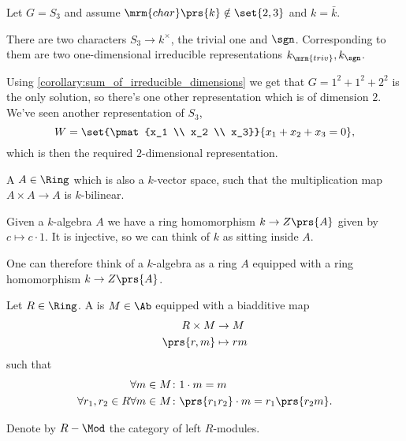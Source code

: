 \documentclass[10pt,a4paper,twoside,openany,hidelinks]{book}
\begin{document}
\begin{example}
Let $G = S_3$ and assume $\mrm{char}\prs{k} \notin \set{2,3}$ and $k = \bar{k}$.

There are two characters $S_3 \to k^\times$, the trivial one and $\sgn$.
Corresponding to them are two one-dimensional irreducible representations $k_{\mrm{triv}}, k_{\sgn}$.

Using \ref{corollary:sum_of_irreducible_dimensions} we get that
$G = 1^2 + 1^2 + 2^2$
is the only solution, so there's one other representation which is of dimension $2$.
We've seen another representation of $S_3$,
\[W = \set{\pmat{x_1 \\ x_2 \\ x_3}}{x_1 + x_2 + x_3 = 0} \text{,}\]
which is then the required $2$-dimensional representation.
\end{example}


\begin{definition}[$k$-Algebra]
A  $A \in \Ring$ which is also a $k$-vector space, such that the multiplication map $A \times A \to A$ is $k$-bilinear.
\end{definition}

\begin{remark}
Given a $k$-algebra $A$ we have a ring homomorphism $k \to Z\prs{A}$ given by $c \mapsto c \cdot 1$. It is injective, so we can think of $k$ as sitting inside $A$.

One can therefore think of a $k$-algebra as a ring $A$ equipped with a ring homomorphism $k \to Z\prs{A}$.
\end{remark}

\begin{definition}[Module]
Let $R \in \Ring$. A  is $M \in \Ab$ equipped with a biadditive map
\begin{align*}
R \times M &\to M \\
\prs{r,m} &\mapsto rm
\end{align*}
such that
\begin{align*}
\forall m \in M \colon & 1 \cdot m = m \\
\forall r_1, r_2 \in R \forall m \in M \colon & \prs{r_1 r_2} \cdot m = r_1 \prs{r_2 m} \text{.}
\end{align*}
\end{definition}

\begin{notation}
Denote by $R-\Mod$ the category of left $R$-modules.
\end{notation}
\end{document}
